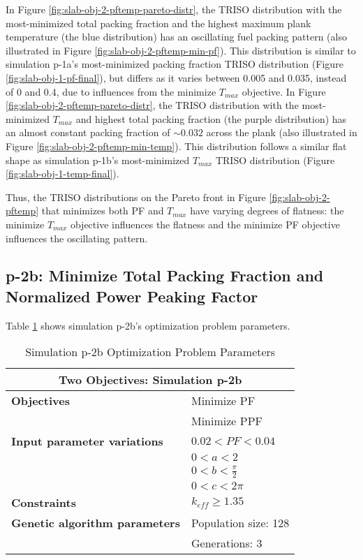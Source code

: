 In Figure \ref{fig:slab-obj-2-pftemp-pareto-distr}, the TRISO distribution with the
most-minimized total packing fraction and the highest maximum plank temperature 
(the blue distribution) has an oscillating fuel packing pattern (also illustrated in 
Figure \ref{fig:slab-obj-2-pftemp-min-pf}).
This distribution is similar to simulation p-1a's most-minimized packing fraction TRISO 
distribution (Figure \ref{fig:slab-obj-1-pf-final}), but differs as it varies between 
0.005 and 0.035, instead of 0 and 0.4, due to influences from the minimize $T_{max}$ 
objective. 
In Figure \ref{fig:slab-obj-2-pftemp-pareto-distr}, the TRISO distribution with the 
most-minimized $T_{max}$ and highest total packing fraction (the purple distribution)
has an almost constant packing fraction of $\sim0.032$ across the plank (also 
illustrated in Figure \ref{fig:slab-obj-2-pftemp-min-temp}). 
This distribution follows a similar flat shape as simulation p-1b's most-minimized 
$T_{max}$ TRISO distribution (Figure \ref{fig:slab-obj-1-temp-final}).

Thus, the \gls{TRISO} distributions on the Pareto front in Figure \ref{fig:slab-obj-2-pftemp} 
that minimizes both PF and $T_{max}$ have varying degrees of flatness: the minimize 
$T_{max}$ objective influences the flatness and the minimize PF objective influences 
the oscillating pattern. 

\subsection{p-2b: Minimize Total Packing Fraction and Normalized Power Peaking Factor}
Table \ref{tab:simulationp2b} shows simulation p-2b's optimization problem parameters. 
\begin{table}[htbp!]
    \centering
    \onehalfspacing
    \caption{Simulation p-2b Optimization Problem Parameters}
	\label{tab:simulationp2b}
    \footnotesize
    \begin{tabular}{l|p{3cm}}
    \hline 
    \multicolumn{2}{c}{\textbf{Two Objectives: Simulation p-2b}} \\
    \hline 
    \textbf{Objectives} & Minimize PF \\
    & Minimize PPF \\
    \hline 
    \textbf{Input parameter variations} & $0.02<PF<0.04$ \\
    & $0<a<2$ \\
    & $0<b<\frac{\pi}{2}$ \\
    & $0<c<2\pi$ \\
    \hline
    \textbf{Constraints} & $k_{eff} \geq 1.35$\\ 
    \hline 
    \textbf{Genetic algorithm parameters} & Population size: 128 \\
    & Generations: 3 \\
    \hline
    \end{tabular}
\end{table}

